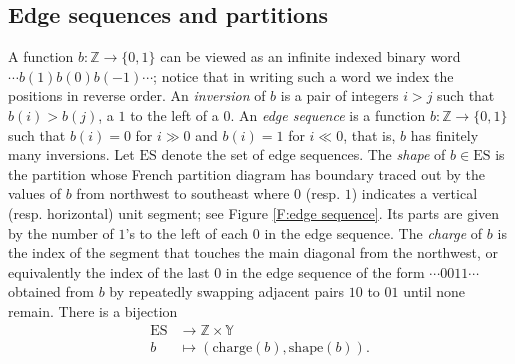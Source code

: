 \documentclass{amsart}
\newcommand{\Z}{\mathbb{Z}}
\newcommand{\Y}{\mathbb{Y}}
\newcommand{\charge}{\mathrm{charge}}
\newcommand{\ES}{\mathrm{ES}}
\newcommand{\shape}{\mathrm{shape}}
\theoremstyle{remark}
\numberwithin{thm}{section}
\numberwithin{equation}{section}
\begin{document}
\subsection{Edge sequences and partitions}
A function $b:\Z\to\{0,1\}$ can be viewed as an infinite indexed binary word $\dotsm b(1) b(0) b(-1) \dotsm$; notice that in writing such a word we index the positions in reverse order. An \emph{inversion} of $b$ is a pair of integers $i>j$ such that $b(i)>b(j)$, a $1$ to the left of a $0$. An \emph{edge sequence} is a function $b:\Z\to\{0,1\}$ such that $b(i)=0$ for $i\gg0$ and $b(i)=1$ for $i\ll0$, that is, $b$ has finitely many inversions. Let $\ES$ denote the set of edge sequences. 
The \emph{shape} of $b\in\ES$ is the partition whose French partition diagram has boundary traced out by the 
values of $b$ from northwest to southeast where $0$ (resp. $1$) indicates a vertical (resp. horizontal) unit segment; see Figure \ref{F:edge sequence}.
Its parts are given by the number of $1$'s to the left of each $0$ in the edge sequence.
The \emph{charge} of $b$ is the index of the segment that touches the main diagonal from the northwest, or equivalently the index of the last $0$ in the edge sequence of the form $\dotsm0011\dotsm$ obtained from $b$ by repeatedly swapping adjacent pairs $10$ to $01$ until none remain.
There is a bijection 
\begin{equation}
\label{E:edge sequence of partition}
\begin{split}
\ES &\to \Z \times \Y \\
b &\mapsto (\charge(b),\shape(b)).
\end{split}
\end{equation}
\end{document}
